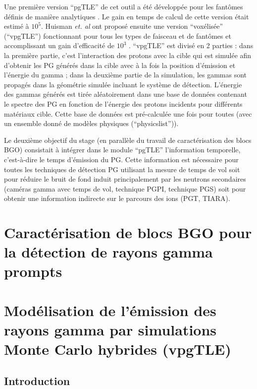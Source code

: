 \documentclass[11pt,a4paper,oldfontcommands]{memoir}
\begin{document}
Une première version \enquote{pgTLE} de cet outil a été développée pour les fantômes définis de manière analytiques \cite{El_Kanawati_2015}. Le gain en temps de calcul de cette version était estimé à $10^5$. Huisman \textit{et. al} ont proposé ensuite une version \enquote{voxélisée} (\enquote{vpgTLE}) fonctionnant pour tous les types de faisceau et de fantômes et accomplissant un gain d'efficacité de $10^3$ \cite{Huisman_2016}. \enquote{vpgTLE} est divisé en 2 parties : dans la première partie, c'est l'interaction des protons avec la cible qui est simulée afin d'obtenir les PG générés dans la cible avec à la fois la position d'émission et l'énergie du gamma  ; dans la deuxième partie de la simulation, les gammas sont propagés dans la géométrie simulée incluant le système de détection. L'énergie des gammas générés est tirée aléatoirement dans une base de données contenant le spectre des PG en fonction de l'énergie des protons incidents pour différents matériaux cible. Cette base de données est pré-calculée une fois pour toutes (avec un ensemble donné de modèles physiques (\enquote{physicslist})).

Le deuxième objectif du stage (en parallèle du travail de caractérisation des blocs BGO) consistait à intégrer dans le module \enquote{pgTLE} l'information temporelle, c'est-à-dire le temps d'émission du PG. Cette information est nécessaire pour toutes les techniques de détection PG utilisant la mesure de temps de vol soit pour réduire le bruit de fond induit principalement par les neutrons secondaires (caméras gamma avec temps de vol, technique PGPI, technique PGS) soit pour obtenir une information indirecte sur le parcours des ions (PGT, TIARA).


\openany
\chapter{Caractérisation de blocs BGO pour la détection de rayons gamma prompts}



\chapter{Modélisation de l'émission des rayons gamma par simulations Monte Carlo hybrides (vpgTLE)}

\section{Introduction}
\end{document}

